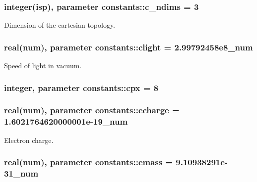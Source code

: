 \subsubsection[{\texorpdfstring{c\+\_\+ndims}{c_ndims}}]{\setlength{\rightskip}{0pt plus 5cm}integer({\bf isp}), parameter constants\+::c\+\_\+ndims = 3}\hypertarget{namespaceconstants_aad8d45b739c41f2926fd2accb3de9dd2}{}\label{namespaceconstants_aad8d45b739c41f2926fd2accb3de9dd2}


Dimension of the cartesian topology. 

\subsubsection[{\texorpdfstring{clight}{clight}}]{\setlength{\rightskip}{0pt plus 5cm}real({\bf num}), parameter constants\+::clight = 2.\+99792458e8\+\_\+num}\hypertarget{namespaceconstants_ac23d8857383002cada2aa571fd859533}{}\label{namespaceconstants_ac23d8857383002cada2aa571fd859533}


Speed of light in vacuum. 

\subsubsection[{\texorpdfstring{cpx}{cpx}}]{\setlength{\rightskip}{0pt plus 5cm}integer, parameter constants\+::cpx = 8}\hypertarget{namespaceconstants_a5709f0ae2ee52b1906446ad25ed0f587}{}\label{namespaceconstants_a5709f0ae2ee52b1906446ad25ed0f587}
\subsubsection[{\texorpdfstring{echarge}{echarge}}]{\setlength{\rightskip}{0pt plus 5cm}real({\bf num}), parameter constants\+::echarge = 1.\+6021764620000001e-\/19\+\_\+num}\hypertarget{namespaceconstants_af0f1098f6be55eab4174890ed5caaf98}{}\label{namespaceconstants_af0f1098f6be55eab4174890ed5caaf98}


Electron charge. 

\subsubsection[{\texorpdfstring{emass}{emass}}]{\setlength{\rightskip}{0pt plus 5cm}real({\bf num}), parameter constants\+::emass = 9.\+10938291e-\/31\+\_\+num}\hypertarget{namespaceconstants_ad39536f583f0861abb2fb19a27c56fc8}{}\label{namespaceconstants_ad39536f583f0861abb2fb19a27c56fc8}


